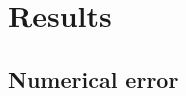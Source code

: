 \documentclass{emulateapj}
\begin{document}

\section{Results}


\label{sec:results}
\subsection{Numerical error}
\end{document}
